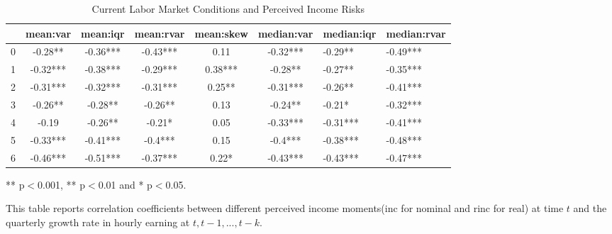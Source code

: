 
\begin{table}[ht]
\centering
\begin{adjustbox}{width={\textwidth}}
\begin{threeparttable}
\caption{Current Labor Market Conditions and Perceived Income Risks}
\label{macro_corr_he}
\begin{tabular}{ccccccll}
\toprule
 & mean:var & mean:iqr & mean:rvar & mean:skew & median:var & median:iqr & median:rvar \\
\midrule
0 & -0.28** & -0.36*** & -0.43*** & 0.11 & -0.32*** & -0.29** & -0.49*** \\
1 & -0.32*** & -0.38*** & -0.29*** & 0.38*** & -0.28** & -0.27** & -0.35*** \\
2 & -0.31*** & -0.32*** & -0.31*** & 0.25** & -0.31*** & -0.26** & -0.41*** \\
3 & -0.26** & -0.28** & -0.26** & 0.13 & -0.24** & -0.21* & -0.32*** \\
4 & -0.19 & -0.26** & -0.21* & 0.05 & -0.33*** & -0.31*** & -0.41*** \\
5 & -0.33*** & -0.41*** & -0.4*** & 0.15 & -0.4*** & -0.38*** & -0.48*** \\
6 & -0.46*** & -0.51*** & -0.37*** & 0.22* & -0.43*** & -0.43*** & -0.47*** \\
\bottomrule
\end{tabular}
\begin{tablenotes}
\item *** p$<$0.001, ** p$<$0.01 and * p$<$0.05.
\item This table reports correlation coefficients between different perceived income moments(inc for nominal
and rinc for real) at time
$t$ and the quarterly growth rate in hourly earning at $t,t-1,...,t-k$.
\end{tablenotes}
\end{threeparttable}
\end{adjustbox}
\end{table}